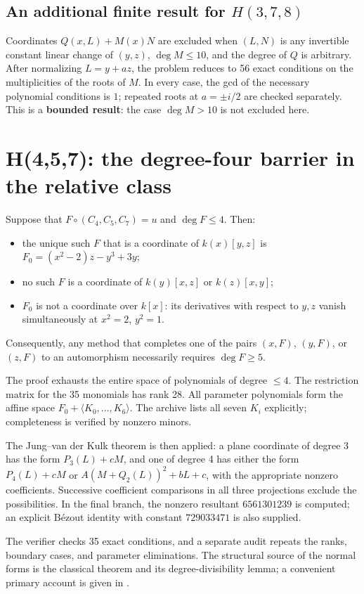 \subsection*{An additional finite result for $H(3,7,8)$}
Coordinates $Q(x,L)+M(x)N$ are excluded when $(L,N)$ is any invertible constant linear change of $(y,z)$, $\deg M\le10$, and the degree of $Q$ is arbitrary. After normalizing $L=y+az$, the problem reduces to 56 exact conditions on the multiplicities of the roots of $M$. In every case, the gcd of the necessary polynomial conditions is $1$; repeated roots at $a=\pm i/2$ are checked separately. This is a \textbf{bounded result}: the case $\deg M>10$ is not excluded here.

\section{H(4,5,7): the degree-four barrier in the relative class}\label{sec:h457}
Suppose that $F\circ(C_4,C_5,C_7)=u$ and $\deg F\le4$. Then:
\begin{itemize}
\item the unique such $F$ that is a coordinate of $k(x)[y,z]$ is $F_0=(x^2-2)z-y^3+3y$;
\item no such $F$ is a coordinate of $k(y)[x,z]$ or $k(z)[x,y]$;
\item $F_0$ is not a coordinate over $k[x]$: its derivatives with respect to $y,z$ vanish simultaneously at $x^2=2$, $y^2=1$.
\end{itemize}
Consequently, any method that completes one of the pairs $(x,F)$, $(y,F)$, or $(z,F)$ to an automorphism necessarily requires $\deg F\ge5$.

The proof exhausts the entire space of polynomials of degree $\le4$. The restriction matrix for the 35 monomials has rank 28. All parameter polynomials form the affine space $F_0+\langle K_0,\ldots,K_6\rangle$. The archive lists all seven $K_i$ explicitly; completeness is verified by nonzero minors.

The Jung--van der Kulk theorem is then applied: a plane coordinate of degree 3 has the form $P_3(L)+cM$, and one of degree 4 has either the form $P_4(L)+cM$ or $A(M+Q_2(L))^2+bL+c$, with the appropriate nonzero coefficients. Successive coefficient comparisons in all three projections exclude the possibilities. In the final branch, the nonzero resultant $6561301239$ is computed; an explicit B\'ezout identity with constant $729033471$ is also supplied.

The verifier checks 35 exact conditions, and a separate audit repeats the ranks, boundary cases, and parameter eliminations. The structural source of the normal forms is the classical theorem and its degree-divisibility lemma; a convenient primary account is given in \cite{Chau}.

